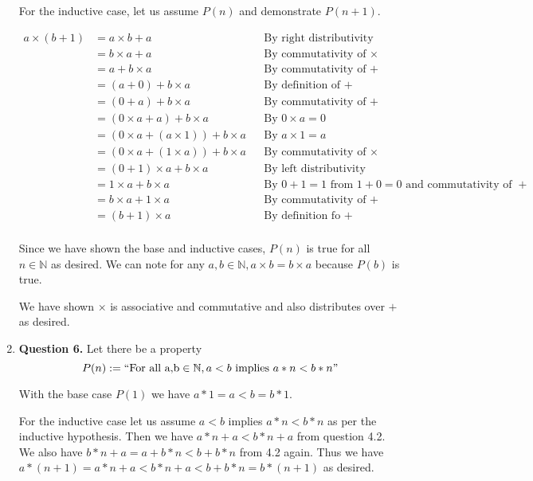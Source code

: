 \documentclass{article}
\begin{document}
\begin{enumerate}
		\medskip
		For the inductive case, let us assume $P(n)$ and demonstrate $P(n + 1)$.
		
		\begin{align*}
			a \times (b + 1) &= a \times b + a && \text{By right distributivity}\\
			&= b \times a + a && \text{By commutativity of $\times$}\\
			&= a + b \times a && \text{By commutativity of $+$}\\
			&= (a + 0) + b \times a && \text{By definition of $+$}\\
			&= (0 + a) + b \times a && \text{By commutativity of $+$}\\
			&= (0 \times a + a) + b \times a && \text{By $0 \times a = 0$}\\
			&= (0 \times a + (a \times 1)) + b \times a && \text{By $a \times 1 = a$}\\
			&= (0 \times a + (1 \times a)) + b \times a && \text{By commutativity of $\times$}\\
			&= (0 + 1) \times a + b \times a && \text{By left distributivity}\\
			&= 1 \times a + b \times a && \text{By $0 + 1 = 1$ from $1 + 0 = 0$ and commutativity of $+$}\\
			&= b \times a + 1 \times a && \text{By commutativity of $+$}\\
			&= (b + 1) \times a && \text{By definition fo $+$}\\
		\end{align*}
		
		Since we have shown the base and inductive cases, $P(n)$ is true for all $n \in \mathbb{N}$ as desired. We can note for any $a,b \in \mathbb{N}, a \times b = b \times a$ because $P(b)$ is true.
		
		\medskip
		
		We have shown $\times$ is associative and commutative and also distributes over $+$ as desired.
		
		\item \textbf{Question 6.}
		Let there be a property $$P(n) := ``\text{For all a,b} \in \mathbb{N}, a < b \text{ implies } a * n < b * n\text{''}$$
		
		\medskip
		With the base case $P(1)$ we have $a * 1 = a < b = b* 1$.
		
		\medskip
		For the inductive case let us assume $a < b$ implies $a * n < b * n$ as per the inductive hypothesis. Then we have $a * n + a < b * n + a$ from question 4.2. We also have $b * n + a = a + b * n < b + b * n$ from 4.2 again. Thus we have $a * (n + 1) = a * n + a < b * n + a < b + b * n = b * (n + 1)$ as desired. 
		

\end{enumerate}
\end{document}
